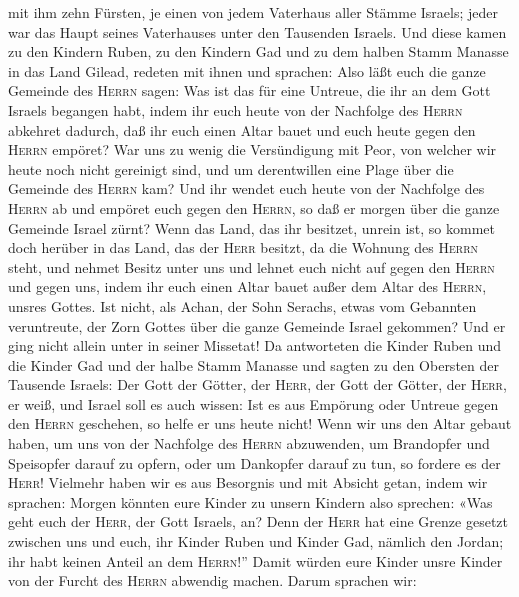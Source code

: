 mit ihm zehn Fürsten, je einen von jedem Vaterhaus aller Stämme Israels;
jeder war das Haupt seines Vaterhauses unter den Tausenden Israels.
 Und diese kamen zu den Kindern Ruben, zu den Kindern Gad
und zu dem halben Stamm Manasse in das Land Gilead, redeten mit ihnen
und sprachen:  Also läßt euch die ganze Gemeinde des
\textsc{Herrn} sagen: Was ist das für eine Untreue, die ihr an dem Gott
Israels begangen habt, indem ihr euch heute von der Nachfolge des
\textsc{Herrn} abkehret dadurch, daß ihr euch einen Altar bauet und euch
heute gegen den \textsc{Herrn} empöret?  War uns zu wenig
die Versündigung mit Peor, von welcher wir heute noch nicht gereinigt
sind, und um derentwillen eine Plage über die Gemeinde des
\textsc{Herrn} kam?  Und ihr wendet euch heute von der
Nachfolge des \textsc{Herrn} ab und empöret euch gegen den
\textsc{Herrn}, so daß er morgen über die ganze Gemeinde Israel zürnt?
 Wenn das Land, das ihr besitzet, unrein ist, so kommet
doch herüber in das Land, das der \textsc{Herr} besitzt, da die Wohnung
des \textsc{Herrn} steht, und nehmet Besitz unter uns und lehnet euch
nicht auf gegen den \textsc{Herrn} und gegen uns, indem ihr euch einen
Altar bauet außer dem Altar des \textsc{Herrn}, unsres Gottes.
 Ist nicht, als Achan, der Sohn Serachs, etwas vom
Gebannten veruntreute, der Zorn Gottes über die ganze Gemeinde Israel
gekommen? Und er ging nicht allein unter in seiner Missetat!
 Da antworteten die Kinder Ruben und die Kinder Gad und
der halbe Stamm Manasse und sagten zu den Obersten der Tausende Israels:
 Der Gott der Götter, der \textsc{Herr}, der Gott der
Götter, der \textsc{Herr}, er weiß, und Israel soll es auch wissen: Ist
es aus Empörung oder Untreue gegen den \textsc{Herrn} geschehen, so
helfe er uns heute nicht!  Wenn wir uns den Altar gebaut
haben, um uns von der Nachfolge des \textsc{Herrn} abzuwenden, um
Brandopfer und Speisopfer darauf zu opfern, oder um Dankopfer darauf zu
tun, so fordere es der \textsc{Herr}!  Vielmehr haben wir
es aus Besorgnis und mit Absicht getan, indem wir sprachen: Morgen
könnten eure Kinder zu unsern Kindern also sprechen: «Was geht euch der
\textsc{Herr}, der Gott Israels, an?  Denn der
\textsc{Herr} hat eine Grenze gesetzt zwischen uns und euch, ihr Kinder
Ruben und Kinder Gad, nämlich den Jordan; ihr habt keinen Anteil an dem
\textsc{Herrn}!'' Damit würden eure Kinder unsre Kinder von der Furcht
des \textsc{Herrn} abwendig machen.  Darum sprachen wir:
